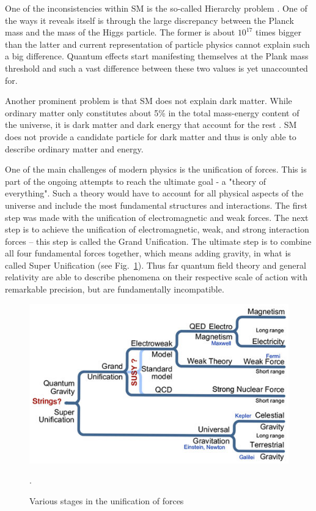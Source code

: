 One of the inconsistencies within SM is the so-called Hierarchy problem \citep{PhysRevD.14.1667}. One of the ways it reveals itself is through the large discrepancy between the Planck mass and the mass of the Higgs particle. The former is about $10^{17}$ times bigger than the latter and current representation of particle physics cannot explain such a big difference. Quantum effects start manifesting themselves at the Plank mass threshold and such a vast difference between these two values is yet unaccounted for. 

Another prominent problem is that SM does not explain dark matter. While ordinary matter only constitutes about 5\% in the total mass-energy content of the universe, it is dark matter and dark energy that account for the rest \citep{ade2014planck}. 
SM does not provide a candidate particle for dark matter and thus is only able to describe ordinary matter and energy. 

One of the main challenges of modern physics is the unification of forces. This is part of the ongoing attempts to reach the ultimate goal - a "theory of everything". Such a theory would have to account for all physical aspects of the universe and include the most fundamental structures and interactions. The first step was made with the unification of electromagnetic and weak forces.  
The next step is to achieve the unification of electromagnetic, weak, and strong interaction forces – this step is called the Grand Unification. The ultimate step is to combine all four fundamental forces together, which means adding gravity, in what is called Super Unification (see Fig.~\ref{fig:unification}). Thus far quantum field theory and general relativity are able to describe phenomena on their respective scale of action with remarkable precision, but are fundamentally incompatible.  
\begin{figure}[ht]
		\centering
			\includegraphics[scale=0.8]{Chap2/Unification}
\caption{\label{fig:unification} Various stages in the unification of forces  \citep{unification}}.
\end{figure}

